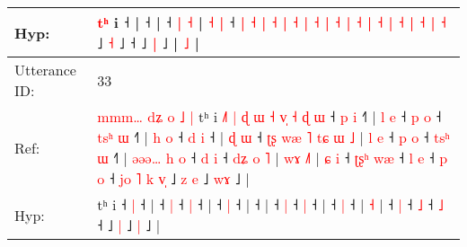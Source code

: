 \documentclass[10pt]{article}
\DeclareRobustCommand{\hl}[1]{{\textcolor{red}{#1}}}
\begin{document}
\begin{longtable}{ll}
 \\
Hyp: & \hl{}\hl{}\hl{}\hl{}\hl{}\hl{t}\hl{ʰ} i ˧ |\hl{}\hl{}\hl{}\hl{} ˧\hl{}\hl{}\hl{}\hl{}\hl{}\hl{}\hl{}\hl{}\hl{}\hl{}\hl{} |\hl{}\hl{} ˧\hl{}\hl{}\hl{}\hl{}\hl{}\hl{}\hl{}\hl{}\hl{}\hl{}\hl{}\hl{}\hl{}\hl{}\hl{}\hl{}\hl{}\hl{}\hl{}\hl{}\hl{}\hl{}\hl{}\hl{}\hl{}\hl{}\hl{} \hl{|} \hl{˧} | \hl{˧} \hl{|} ˧ \hl{}\hl{|} \hl{˧} \hl{|} \hl{˧} \hl{|} \hl{˧} \hl{|} \hl{˧} \hl{|} \hl{˧} \hl{|} \hl{˧} \hl{|} \hl{˧} \hl{|} \hl{˧} \hl{|} \hl{˧} \hl{|} \hl{˧} ˩\hl{}\hl{} \hl{˧} ˩\hl{}\hl{}\hl{}\hl{}\hl{}\hl{} ˧\hl{}\hl{}\hl{}\hl{}\hl{} ˩\hl{}\hl{} \hl{|} ˩ |\hl{}\hl{}\hl{}\hl{}\hl{}\hl{}\hl{}\hl{}\hl{}\hl{}\hl{}\hl{}\hl{}\hl{}\hl{}\hl{}\hl{}\hl{}\hl{}\hl{}\hl{}\hl{}\hl{}\hl{}\hl{}\hl{}\hl{} \hl{˩} |
 \\
\midrule
Utterance ID: & 33 \\
Ref: & \hl{m}\hl{m}\hl{m}\hl{…}\hl{ }\hl{d}\hl{ʑ}\hl{ }\hl{o}\hl{ }\hl{˩}\hl{ }\hl{|}\hl{ }tʰ i\hl{ }\hl{˩}\hl{˥}\hl{ }\hl{|}\hl{ }\hl{ɖ}\hl{ }\hl{ɯ}\hl{ }\hl{˧}\hl{ }\hl{v}\hl{̩}\hl{ }\hl{˧}\hl{ }\hl{ɖ}\hl{ }\hl{ɯ} ˧\hl{ }\hl{p} \hl{i} ˧\hl{˥} |\hl{ }\hl{l}\hl{ }\hl{e} ˧\hl{ }\hl{p} \hl{o} ˧\hl{ }\hl{t}\hl{s}\hl{ʰ} \hl{ɯ} ˧\hl{˥} |\hl{ }\hl{h}\hl{ }\hl{o} ˧\hl{ }\hl{d} \hl{i} ˧ |\hl{ }\hl{ɖ}\hl{ }\hl{ɯ} ˧\hl{ }\hl{ʈ}\hl{ʂ}\hl{ }\hl{w}\hl{æ}\hl{ }\hl{˥}\hl{ }\hl{t}\hl{ɕ}\hl{ }\hl{ɯ}\hl{ }\hl{˩} |\hl{ }\hl{l}\hl{ }\hl{e} ˧\hl{ }\hl{p} \hl{o} ˧\hl{ }\hl{t}\hl{s}\hl{ʰ} \hl{ɯ} ˧\hl{˥} |\hl{ }\hl{ə}\hl{ə}\hl{ə}\hl{…}\hl{ }\hl{h}\hl{ }\hl{o} ˧\hl{ }\hl{d} \hl{i} ˧\hl{ }\hl{d}\hl{ʑ}\hl{ }\hl{o}\hl{ }\hl{˥} |\hl{ }\hl{w}\hl{ɤ} \hl{˩}\hl{˥} |\hl{ }\hl{ɕ}\hl{ }\hl{i} ˧\hl{ }\hl{ʈ}\hl{ʂ}\hl{ʰ} \hl{w}\hl{æ} ˧\hl{ }\hl{l} \hl{e} ˧\hl{ }\hl{p} \hl{o} ˧\hl{ }\hl{j}\hl{o}\hl{ }\hl{˥}\hl{ }\hl{k}\hl{ }\hl{v}\hl{̩} ˩\hl{ }\hl{z} \hl{e} ˩ \hl{w}\hl{ɤ} ˩ |
 \\
Hyp: & \hl{}\hl{}\hl{}\hl{}\hl{}\hl{}\hl{}\hl{}\hl{}\hl{}\hl{}\hl{}\hl{}\hl{}tʰ i\hl{}\hl{}\hl{}\hl{}\hl{}\hl{}\hl{}\hl{}\hl{}\hl{}\hl{}\hl{}\hl{}\hl{}\hl{}\hl{}\hl{}\hl{}\hl{}\hl{} ˧\hl{}\hl{} \hl{|} ˧\hl{} |\hl{}\hl{}\hl{}\hl{} ˧\hl{}\hl{} \hl{|} ˧\hl{}\hl{}\hl{}\hl{} \hl{|} ˧\hl{} |\hl{}\hl{}\hl{}\hl{} ˧\hl{}\hl{} \hl{|} ˧ |\hl{}\hl{}\hl{}\hl{} ˧\hl{}\hl{}\hl{}\hl{}\hl{}\hl{}\hl{}\hl{}\hl{}\hl{}\hl{}\hl{}\hl{}\hl{}\hl{} |\hl{}\hl{}\hl{}\hl{} ˧\hl{}\hl{} \hl{|} ˧\hl{}\hl{}\hl{}\hl{} \hl{|} ˧\hl{} |\hl{}\hl{}\hl{}\hl{}\hl{}\hl{}\hl{}\hl{}\hl{} ˧\hl{}\hl{} \hl{|} ˧\hl{}\hl{}\hl{}\hl{}\hl{}\hl{}\hl{} |\hl{}\hl{}\hl{} \hl{}\hl{˧} |\hl{}\hl{}\hl{}\hl{} ˧\hl{}\hl{}\hl{}\hl{} \hl{}\hl{|} ˧\hl{}\hl{} \hl{˩} ˧\hl{}\hl{} \hl{˩} ˧\hl{}\hl{}\hl{}\hl{}\hl{}\hl{}\hl{}\hl{}\hl{}\hl{} ˩\hl{}\hl{} \hl{|} ˩ \hl{}\hl{|} ˩ |

\end{longtable}
\end{document}
